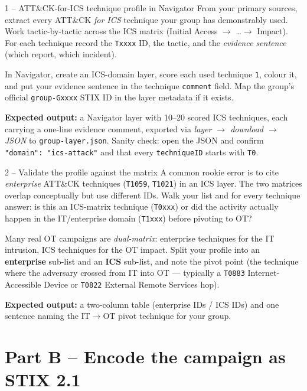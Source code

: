 \documentclass[11pt,a4paper]{article}
\begin{document}
\begin{stepbox}{1 -- ATT\&CK-for-ICS technique profile in Navigator}
From your primary sources, extract every ATT\&CK \emph{for ICS} technique your
group has demonstrably used. Work tactic-by-tactic across the ICS matrix
(Initial Access $\to$ \dots $\to$ Impact). For each technique record the
\texttt{Txxxx} ID, the tactic, and the \emph{evidence sentence} (which report,
which incident).

In Navigator, create an ICS-domain layer, score each used technique \texttt{1},
colour it, and put your evidence sentence in the technique \texttt{comment}
field. Map the group's official \texttt{group-Gxxxx} STIX ID in the layer
metadata if it exists.

\textbf{Expected output:} a Navigator layer with 10--20 scored ICS techniques,
each carrying a one-line evidence comment, exported via
\emph{layer $\to$ download $\to$ JSON} to \texttt{group-layer.json}. Sanity
check: open the JSON and confirm \texttt{"domain": "ics-attack"} and that every
\texttt{techniqueID} starts with \texttt{T0}.
\end{stepbox}

\begin{stepbox}{2 -- Validate the profile against the matrix}
A common rookie error is to cite \emph{enterprise} ATT\&CK techniques
(\texttt{T1059}, \texttt{T1021}) in an ICS layer. The two matrices overlap
conceptually but use different IDs. Walk your list and for every technique
answer: is this an ICS-matrix technique (\texttt{T0xxx}) or did the activity
actually happen in the IT/enterprise domain (\texttt{T1xxx}) before pivoting to
OT?

Many real OT campaigns are \emph{dual-matrix}: enterprise techniques for the IT
intrusion, ICS techniques for the OT impact. Split your profile into an
\textbf{enterprise} sub-list and an \textbf{ICS} sub-list, and note the
pivot point (the technique where the adversary crossed from IT into OT ---
typically a \texttt{T0883} Internet-Accessible Device or \texttt{T0822}
External Remote Services hop).

\textbf{Expected output:} a two-column table (enterprise IDs / ICS IDs) and one
sentence naming the IT$\to$OT pivot technique for your group.
\end{stepbox}

\section*{Part B -- Encode the campaign as STIX 2.1}
\end{document}

